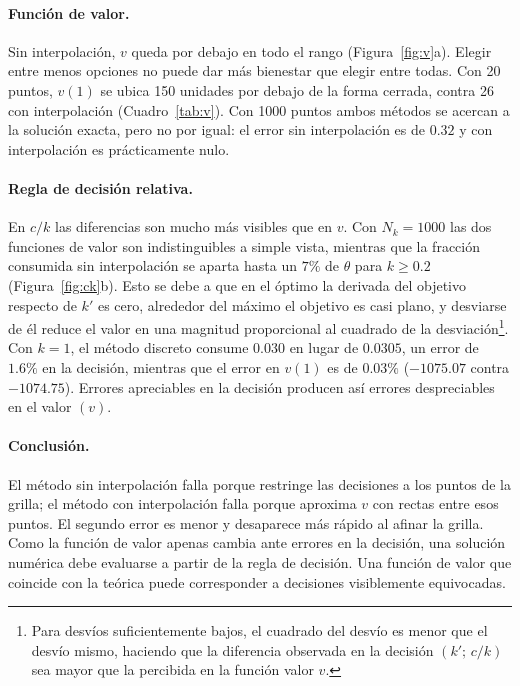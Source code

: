 \documentclass[11pt,a4paper]{article}
\begin{document}
\paragraph{Función de valor.} Sin interpolación, $v$ queda por debajo en todo el rango (Figura~\ref{fig:v}a). Elegir entre menos opciones no puede dar más bienestar que elegir entre todas. Con 20 puntos, $v(1)$ se ubica 150 unidades por debajo de la forma cerrada, contra 26 con interpolación (Cuadro~\ref{tab:v}). Con 1000 puntos ambos métodos se acercan a la solución exacta, pero no por igual: el error sin interpolación es de $0.32$ y con interpolación es prácticamente nulo.

\paragraph{Regla de decisión relativa.} En $c/k$ las diferencias son mucho más visibles que en $v$. Con $N_k=1000$ las dos funciones de valor son indistinguibles a simple vista, mientras que la fracción consumida sin interpolación se aparta hasta un $7\%$ de $\theta$ para $k\geq0.2$ (Figura~\ref{fig:ck}b).
Esto se debe a que en el óptimo la derivada del objetivo respecto de $k'$ es cero, alrededor del máximo el objetivo es casi plano, y desviarse de él reduce el valor en una magnitud proporcional al cuadrado de la desviación\footnote{Para desvíos suficientemente bajos, el cuadrado del desvío es menor que el desvío mismo, haciendo que la diferencia observada en la decisión $(k';\,c/k)$ sea mayor que la percibida en la función valor $v$.}. Con $k=1$, el método discreto consume $0.030$ en lugar de $0.0305$, un error de $1.6\%$ en la decisión, mientras que el error en $v(1)$ es de $0.03\%$ ($-1075.07$ contra $-1074.75$).
Errores apreciables en la decisión producen así errores despreciables en el valor $(v)$.

\paragraph{Conclusión.} El método sin interpolación falla porque restringe las decisiones a los puntos de la grilla; el método con interpolación falla porque aproxima $v$ con rectas entre esos puntos. El segundo error es menor y desaparece más rápido al afinar la grilla. Como la función de valor apenas cambia ante errores en la decisión, una solución numérica debe evaluarse a partir de la regla de decisión. Una función de valor que coincide con la teórica puede corresponder a decisiones visiblemente equivocadas.
\end{document}
